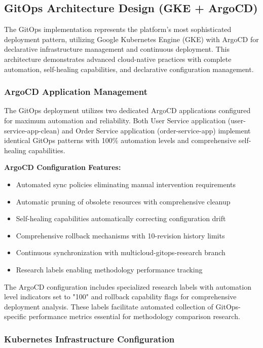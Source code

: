 \subsection{GitOps Architecture Design (GKE + ArgoCD)}

The GitOps implementation represents the platform's most sophisticated deployment pattern, utilizing Google Kubernetes Engine (GKE) with ArgoCD for declarative infrastructure management and continuous deployment. This architecture demonstrates advanced cloud-native practices with complete automation, self-healing capabilities, and declarative configuration management.

\subsubsection{ArgoCD Application Management}

The GitOps deployment utilizes two dedicated ArgoCD applications configured for maximum automation and reliability. Both User Service application (user-service-app-clean) and Order Service application (order-service-app) implement identical GitOps patterns with 100\% automation levels and comprehensive self-healing capabilities.

\textbf{ArgoCD Configuration Features:}
\begin{itemize}
\item Automated sync policies eliminating manual intervention requirements
\item Automatic pruning of obsolete resources with comprehensive cleanup
\item Self-healing capabilities automatically correcting configuration drift
\item Comprehensive rollback mechanisms with 10-revision history limits
\item Continuous synchronization with multicloud-gitops-research branch
\item Research labels enabling methodology performance tracking
\end{itemize}

The ArgoCD configuration includes specialized research labels with automation level indicators set to "100" and rollback capability flags for comprehensive deployment analysis. These labels facilitate automated collection of GitOps-specific performance metrics essential for methodology comparison research.

\subsubsection{Kubernetes Infrastructure Configuration}

